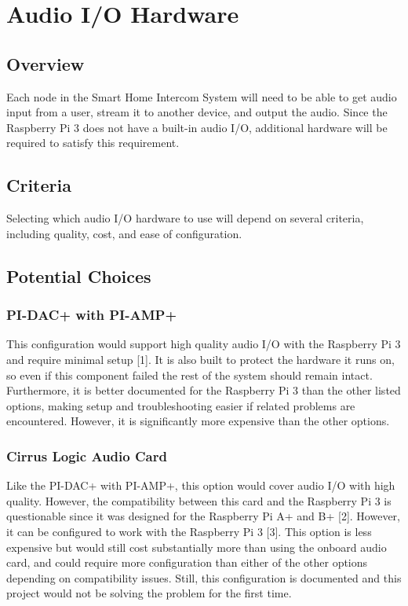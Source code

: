\documentclass[onecolumn, draftclsnofoot,10pt, compsoc]{IEEEtran}
\begin{document}
\section{Audio I/O Hardware}
\subsection{Overview}
Each node in the Smart Home Intercom System will need to be able to get audio input from a user, stream it to another device, and output the audio. Since the Raspberry Pi 3 does not have a built-in audio I/O, additional hardware will be required to satisfy this requirement. 
\subsection{Criteria}
Selecting which audio I/O hardware to use will depend on several criteria, including quality, cost, and ease of configuration. 

\subsection{Potential Choices}
\subsubsection{PI-DAC+ with PI-AMP+}
This configuration would support high quality audio I/O with the Raspberry Pi 3 and require minimal setup [1]. It is also built to protect the hardware it runs on, so even if this component failed the rest of the system should remain intact. Furthermore, it is better documented for the Raspberry Pi 3 than the other listed options, making setup and troubleshooting easier if related problems are encountered. However, it is significantly more expensive than the other options. 
\subsubsection{Cirrus Logic Audio Card}
Like the PI-DAC+ with PI-AMP+, this option would cover audio I/O with high quality. However, the compatibility between this card and the Raspberry Pi 3 is questionable since it was designed for the Raspberry Pi A+ and B+ [2]. However, it can be configured to work with the Raspberry Pi 3 [3]. This option is less expensive but would still cost substantially more than using the onboard audio card, and could require more configuration than either of the other options depending on compatibility issues. Still, this configuration is documented and this project would not be solving the problem for the first time. 
\end{document}
